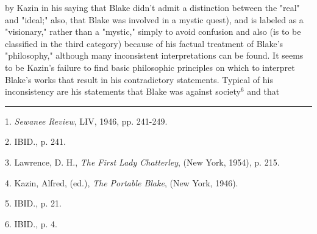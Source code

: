 by Kazin in his saying that Blake didn't admit a distinction between the "real" and "ideal;" also, that Blake was
involved in a mystic quest), and is labeled as a "visionary," rather than a "mystic," simply to avoid confusion and also
(is to be classified in the third category) because of his factual treatment of Blake's "philosophy," although many inconsistent
interpretations can be found. It seems to be Kazin's failure to find basic philosophic principles on which to interpret Blake's works that
result in his contradictory statements. Typical of his inconsistency are his statements that Blake was against society$^{6}$ and that\linebreak
\null\par
\vspace*{-\baselineskip}
\vspace*{\fill}
\noindent\rule{0.25\textwidth}{0.4pt}\par
1. \textit{Sewanee Review}, LIV, 1946, pp. 241-249.\par
2. IBID., p. 241.\par
3. Lawrence, D. H., \textit{The First Lady Chatterley}, (New York, 1954), p. 215.\par
4. Kazin, Alfred, (ed.), \textit{The Portable Blake}, (New York, 1946).\par
5. IBID., p. 21.\par
6. IBID., p. 4.\par

\newpage

